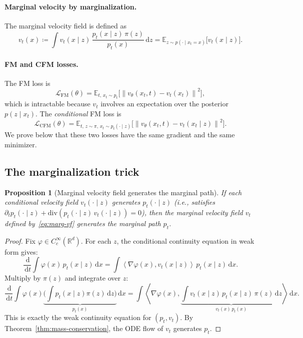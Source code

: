 \documentclass[11pt]{article}
\newcommand{\R}{\mathbb{R}}
\newcommand{\E}{\mathbb{E}}
\newcommand{\grad}{\nabla}
\newcommand{\diver}{\mathrm{div}}
\newcommand{\norm}[1]{\left\lVert #1 \right\rVert}
\newcommand{\inner}[2]{\left\langle #1,#2 \right\rangle}
\newcommand{\dd}{\,\mathrm{d}}
\newtheorem{proposition}[theorem]{Proposition}
\theoremstyle{definition}
\theoremstyle{remark}
\begin{document}
\paragraph{Marginal velocity by marginalization.}
The marginal velocity field is defined as
\begin{equation}\label{eq:marg-vf}
v_t(x) \coloneqq \int v_t(x\mid z)\,\frac{p_t(x\mid z)\,\pi(z)}{p_t(x)}\dd z = \E_{z\sim p(\cdot\mid x_t=x)}\!\big[v_t(x\mid z)\big].
\end{equation}

\paragraph{FM and CFM losses.}
The FM loss is
\[
\mathcal{L}_{\mathrm{FM}}(\theta) = \E_{t,\,x_t\sim p_t}\!\big[\norm{v_\theta(x_t,t) - v_t(x_t)}^2\big],
\]
which is intractable because $v_t$ involves an expectation over the posterior $p(z\mid x_t)$.
The \emph{conditional} FM loss is
\begin{equation}\label{eq:cfm-loss}
\mathcal{L}_{\mathrm{CFM}}(\theta) = \E_{t,\,z\sim\pi,\,x_t\sim p_t(\cdot\mid z)}\!\big[\norm{v_\theta(x_t,t) - v_t(x_t\mid z)}^2\big].
\end{equation}
We prove below that these two losses have the same gradient and the same minimizer.

\subsection{The marginalization trick}\label{subsec:marg-trick}

\begin{proposition}[Marginal velocity field generates the marginal path]\label{prop:marg-vf-generates}
If each conditional velocity field $v_t(\cdot\mid z)$ generates $p_t(\cdot\mid z)$ (i.e., satisfies $\partial_t p_t(\cdot\mid z) + \diver(p_t(\cdot\mid z)\,v_t(\cdot\mid z)) = 0$), then the marginal velocity field $v_t$ defined by~\eqref{eq:marg-vf} generates the marginal path $p_t$.
\end{proposition}

\begin{proof}
Fix $\varphi\in C_c^\infty(\R^d)$.
For each $z$, the conditional continuity equation in weak form gives:
\[
\frac{\dd}{\dd t}\int \varphi(x)\,p_t(x\mid z)\dd x = \int \inner{\grad\varphi(x)}{v_t(x\mid z)}\,p_t(x\mid z)\dd x.
\]
Multiply by $\pi(z)$ and integrate over $z$:
\[
\frac{\dd}{\dd t}\int \varphi(x)\underbrace{\Big(\int p_t(x\mid z)\pi(z)\dd z\Big)}_{p_t(x)}\dd x
= \int \inner{\grad\varphi(x)}{\underbrace{\int v_t(x\mid z)\,p_t(x\mid z)\,\pi(z)\dd z}_{v_t(x)\,p_t(x)}}\dd x.
\]
This is exactly the weak continuity equation for $(p_t, v_t)$.
By Theorem~\ref{thm:mass-conservation}, the ODE flow of $v_t$ generates $p_t$.
\end{proof}
\end{document}
